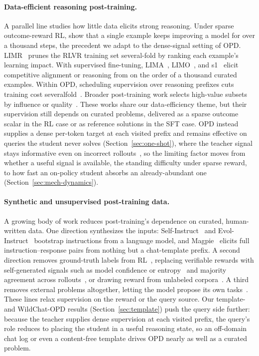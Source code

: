 \paragraph{Data-efficient reasoning post-training.}
A parallel line studies how little data elicits strong reasoning. Under sparse outcome-reward RL, \citet{wang2025oneshot} show that a single example keeps improving a model for over a thousand steps, the precedent we adapt to the dense-signal setting of OPD. LIMR~\citep{limr} prunes the RLVR training set several-fold by ranking each example's learning impact. With supervised fine-tuning, LIMA~\citep{zhou2023lima}, LIMO~\citep{ye2025limo}, and s1~\citep{muennighoff2025s1} elicit competitive alignment or reasoning from on the order of a thousand curated examples. Within OPD, scheduling supervision over reasoning prefixes cuts training cost severalfold~\citep{zhang2026fast}. Broader post-training work selects high-value subsets by influence or quality~\citep{xia2024less,chen2024alpagasus,he2025right,he2025air}. These works share our data-efficiency theme, but their supervision still depends on curated problems, delivered as a sparse outcome scalar in the RL case or as reference solutions in the SFT case. OPD instead supplies a dense per-token target at each visited prefix and remains effective on queries the student never solves (Section~\ref{sec:one-shot}), where the teacher signal stays informative even on incorrect rollouts~\citep{armandpour2026unmasking}, so the limiting factor moves from whether a useful signal is available, the standing difficulty under sparse reward, to how fast an on-policy student absorbs an already-abundant one (Section~\ref{sec:mech-dynamics}).

\paragraph{Synthetic and unsupervised post-training data.}
A growing body of work reduces post-training's dependence on curated, human-written data. One direction synthesizes the inputs: Self-Instruct~\citep{wang2023self} and Evol-Instruct~\citep{xu2024wizardlm} bootstrap instructions from a language model, and Magpie~\citep{xu2025magpie} elicits full instruction--response pairs from nothing but a chat-template prefix. A second direction removes ground-truth labels from RL~\citep{he2026far}, replacing verifiable rewards with self-generated signals such as model confidence or entropy~\citep{zhao2026learning,agarwal2026unreasonable} and majority agreement across rollouts~\citep{zuo2026ttrl}, or drawing reward from unlabeled corpora~\citep{dong2025reinforcement}. A third removes external problems altogether, letting the model propose its own tasks~\citep{zhao2026absolute,zweiger2026self}. These lines relax supervision on the reward or the query source. Our template- and WildChat-OPD results (Section~\ref{sec:template}) push the query side further: because the teacher supplies dense supervision at each visited prefix, the query's role reduces to placing the student in a useful reasoning state, so an off-domain chat log or even a content-free template drives OPD nearly as well as a curated problem.